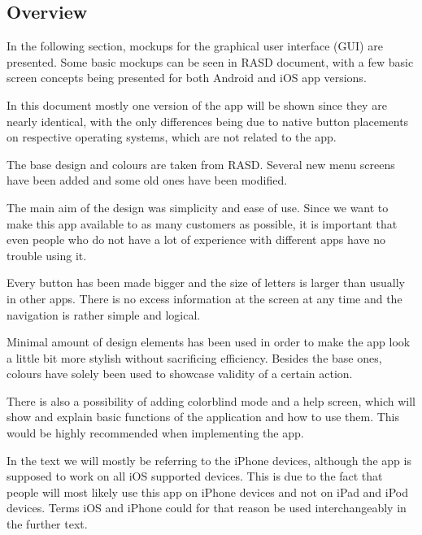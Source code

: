 \subsection{Overview}
\hspace{\parindent}In the following section, mockups for the graphical user interface (GUI) are presented.  
Some basic mockups can be seen in RASD document, with a few basic screen concepts being presented for both Android and iOS app versions. \newline

In this document mostly one version of the app will be shown since they are nearly identical, with the only differences being due to native button placements on respective operating systems, which are not related to the app. \newline
 
The base design and colours are taken from RASD. Several new menu screens have been added and some old ones have been modified.  

The main aim of the design was simplicity and ease of use. Since we want to make this app available to as many customers as possible, it is important that even people who do not have a lot of experience with different apps have no trouble using it. \newline 

Every button has been made bigger and the size of letters is larger than usually in other apps. There is no excess information at the screen at any time and the navigation is rather simple and logical.  \newline

Minimal amount of design elements has been used in order to make the app look a little bit more stylish without sacrificing efficiency. Besides the base ones, colours have solely been used to showcase validity of a certain action.  \newline


There is also a possibility of adding colorblind mode and a help screen, which will show and explain basic functions of the application and how to use them. This would be highly recommended when implementing the app. \newline

In the text we will mostly be referring to the iPhone devices, although the app is supposed to work on all iOS supported devices. This is due to the fact that people will most likely use this app on iPhone devices and not on iPad and iPod devices. Terms iOS and iPhone could for that reason be used interchangeably in the further text.
\newpage
